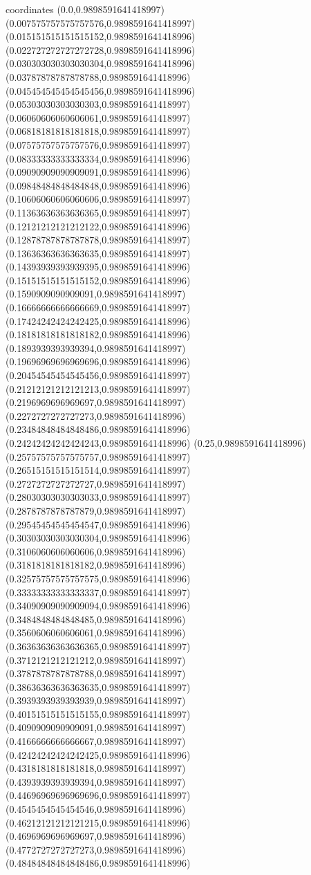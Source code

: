 coordinates {%
(0.0,0.9898591641418997)
(0.007575757575757576,0.9898591641418997)
(0.015151515151515152,0.9898591641418996)
(0.022727272727272728,0.9898591641418996)
(0.030303030303030304,0.9898591641418996)
(0.03787878787878788,0.9898591641418996)
(0.045454545454545456,0.9898591641418996)
(0.05303030303030303,0.9898591641418997)
(0.06060606060606061,0.9898591641418997)
(0.06818181818181818,0.9898591641418997)
(0.07575757575757576,0.9898591641418997)
(0.08333333333333334,0.9898591641418996)
(0.09090909090909091,0.9898591641418996)
(0.09848484848484848,0.9898591641418996)
(0.10606060606060606,0.9898591641418997)
(0.11363636363636365,0.9898591641418997)
(0.12121212121212122,0.9898591641418996)
(0.12878787878787878,0.9898591641418997)
(0.13636363636363635,0.9898591641418997)
(0.14393939393939395,0.9898591641418996)
(0.15151515151515152,0.9898591641418996)
(0.1590909090909091,0.9898591641418997)
(0.16666666666666669,0.9898591641418997)
(0.17424242424242425,0.9898591641418996)
(0.18181818181818182,0.9898591641418996)
(0.1893939393939394,0.9898591641418997)
(0.19696969696969696,0.9898591641418996)
(0.20454545454545456,0.9898591641418997)
(0.21212121212121213,0.9898591641418997)
(0.2196969696969697,0.9898591641418997)
(0.2272727272727273,0.9898591641418996)
(0.23484848484848486,0.9898591641418996)
(0.24242424242424243,0.9898591641418996)
(0.25,0.9898591641418996)
(0.25757575757575757,0.9898591641418997)
(0.26515151515151514,0.9898591641418997)
(0.2727272727272727,0.9898591641418997)
(0.28030303030303033,0.9898591641418997)
(0.2878787878787879,0.9898591641418997)
(0.29545454545454547,0.9898591641418996)
(0.30303030303030304,0.9898591641418996)
(0.3106060606060606,0.9898591641418996)
(0.3181818181818182,0.9898591641418996)
(0.32575757575757575,0.9898591641418996)
(0.33333333333333337,0.9898591641418997)
(0.34090909090909094,0.9898591641418996)
(0.3484848484848485,0.9898591641418996)
(0.3560606060606061,0.9898591641418996)
(0.36363636363636365,0.9898591641418997)
(0.3712121212121212,0.9898591641418997)
(0.3787878787878788,0.9898591641418997)
(0.38636363636363635,0.9898591641418997)
(0.3939393939393939,0.9898591641418997)
(0.40151515151515155,0.9898591641418997)
(0.4090909090909091,0.9898591641418997)
(0.4166666666666667,0.9898591641418997)
(0.42424242424242425,0.9898591641418996)
(0.4318181818181818,0.9898591641418997)
(0.4393939393939394,0.9898591641418997)
(0.44696969696969696,0.9898591641418997)
(0.4545454545454546,0.9898591641418996)
(0.46212121212121215,0.9898591641418996)
(0.4696969696969697,0.9898591641418996)
(0.4772727272727273,0.9898591641418996)
(0.48484848484848486,0.9898591641418996)
}
